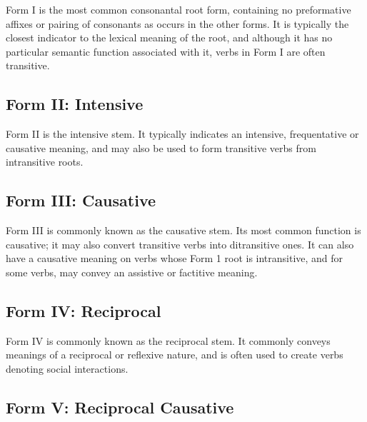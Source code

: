 \documentclass[grammar]{subfiles}
\begin{document}
  Form I is the most common consonantal root form, containing no preformative
  affixes or pairing of consonants as occurs in the other forms.  It is
  typically the closest indicator to the lexical meaning of the root, and
  although it has no particular semantic function associated with it, verbs in
  Form I are often transitive.


  \subsection{Form II: Intensive}
  \label{ssec:vm_form_ii}

  Form II is the intensive stem.  It typically indicates an intensive,
  frequentative or causative meaning, and may also be used to form transitive
  verbs from intransitive roots.
   
   
  \subsection{Form III: Causative}
  \label{ssec:vm_form_iii}

   Form III is commonly known as the causative stem.  Its most common function
   is causative; it may also convert transitive verbs into ditransitive ones.
   It can also have a causative meaning on verbs whose Form 1 root is
   intransitive, and for some verbs, may convey an assistive or factitive
   meaning.
   
%   
  \subsection{Form IV: Reciprocal}
  \label{ssec:vm_form_iv}

   Form IV is commonly known as the reciprocal stem.  It commonly conveys
   meanings of a reciprocal or reflexive nature, and is often used to create
   verbs denoting social interactions. 
   
%   
  \subsection{Form V: Reciprocal Causative}
  \label{ssec:vm_form_v}
\end{document}
